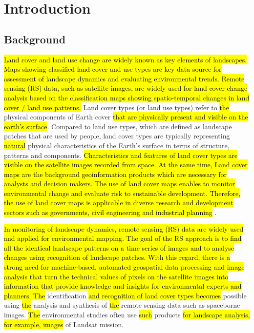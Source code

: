 \documentclass[earth,article,submit,pdftex,moreauthors]{Definitions/mdpi}
\begin{document}
\section{Introduction}


\subsection{Background}
\hl{Land cover and land use change are widely known as key elements of landscapes. Maps showing classified land cover and use types are key data source for assessment of landscape dynamics and evaluating environmental trends. Remote sensing (RS) data, such as satellite images, are widely used for land cover change analysis based on the classification maps showing spatio-temporal changes in land cover / land use patterns. }Land cover types (or land use types) refer to \hl{the} physical\hl{ }components of Earth cover \hl{ that are physically present and visible on the earth's surface}. Compared to land use types, which are defined as landscape patches that are used by\hl{ }people, land cover types are typically representing \hl{natural }physical characteristics of the Earth's surface in terms of structure, patterns and components. \hl{Characteristics and features of land cover types are visible on the satellite images recorded from space. At the same time, Land cover maps are the background geoinformation products which are necessary for analysts and decision makers. The use of land cover maps enables to monitor environmental change and evaluate risk to sustainable development. Therefore, the use of land cover maps is applicable in diverse research and development sectors such as governments, civil engineering and industrial planning} \cite{9553499}.

\hl{In monitoring of landscape dynamics, remote sensing (RS) data are widely used and applied for environmental mapping. The goal of the RS approach is to find all the identical landscape patterns on a time series of images and to analyse changes using recognition of landscape patches. With this regard, there is a strong need for machine-based, automated geospatial data processing and image analysis that turn the technical values of pixels on the satellite images into information that provide knowledge and insights for environmental experts and planners. The} identification\hl{ and recognition of land cover types becomes }possible using \hl{the }analysis and synthesis of \hl{the }remote sensing data such as spaceborne images. \hl{The} environmental studies often use \hl{such} products\hl{ for landscape analysis, for example, images }of Landsat mission. 
\end{document}

